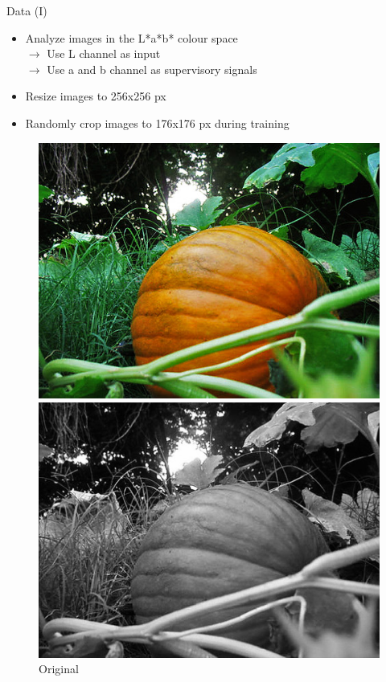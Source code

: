 \documentclass{beamer}
\begin{document}

\begin{frame}{Data (I)}
  \begin{itemize}
    \item Analyze images in the L*a*b* colour space \\
          $\rightarrow$ Use L channel as input \\
          $\rightarrow$ Use a and b channel as supervisory signals
    \item Resize images to 256x256 px
    \item Randomly crop images to 176x176 px during training
  \end{itemize}

  \medskip

  \begin{figure}[!htb]
      \includegraphics[width=\linewidth]{resources/pumpkin.jpg}
      \caption{Original}
    \endminipage\hfill
      \includegraphics[width=\linewidth]{resources/pumpkin_bw.jpg}

\end{figure}
\end{frame}
\end{document}
